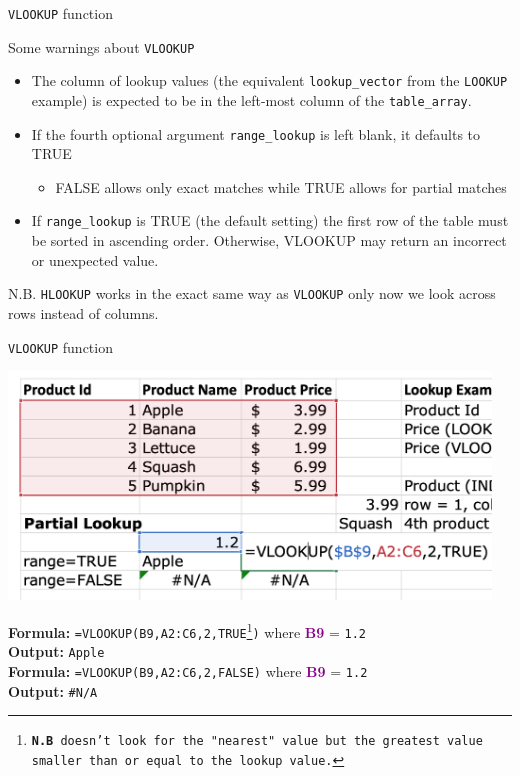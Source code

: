 \documentclass[xcolor=svgnames]{beamer}
\newcommand{\cell}[1]{{\sf \textbf{\textcolor{DarkMagenta}{#1}}}}
\begin{document}
\begin{frame}{\texttt{VLOOKUP} function}
  \begin{alertblock}{
  Some warnings about {\tt VLOOKUP}}
    \begin{itemize}
    \item 
    The column of lookup values (the equivalent {\tt lookup\_vector} from the {\tt LOOKUP} example) is expected to be in the left-most column of the {\tt table\_array}.
    \item If the fourth optional argument \texttt{range\_lookup} is left blank, it defaults to TRUE
    \begin{itemize}
    \item FALSE allows only exact matches while TRUE allows for partial matches
    \end{itemize}
\item If {\tt range\_lookup} is TRUE (the default setting) the first row of the table must be sorted in ascending order. Otherwise, VLOOKUP may return an incorrect or unexpected value.
    \end{itemize}
  \end{alertblock}
N.B. {\tt HLOOKUP} works in the exact same way as {\tt VLOOKUP} only now we look across rows instead of columns.
\end{frame}


\begin{frame}[fragile]{\texttt{VLOOKUP} function}
\begin{center}
 \includegraphics[width=0.96\textwidth]{img/partialLookupZoom}
\end{center}
{\small
{\bf Formula:} {\tt =VLOOKUP(B9,A2:C6,2,TRUE\footnote{\textbf{N.B} doesn't look for the "nearest" value but the greatest value smaller than or equal to the lookup value.})} where \cell{B9} = {\tt 1.2}\\
{\bf Output:} {\tt Apple}\\
{\bf Formula:} {\tt =VLOOKUP(B9,A2:C6,2,FALSE)} where \cell{B9} = {\tt 1.2}\\
{\bf Output:} {\tt \#N/A}}

\end{frame}
\end{document}
